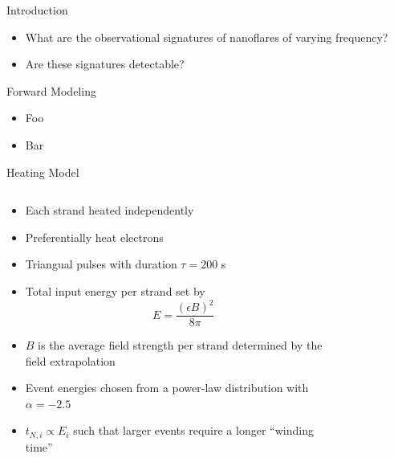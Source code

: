 \documentclass[final]{beamer}
\begin{document}
\begin{frame}
\begin{columns}[T]
\begin{column}{0.49\linewidth}
\begin{block}{Introduction}
\begin{itemize}
      \begin{itemize}
        \item What are the observational signatures of nanoflares of varying frequency?
        \item Are these signatures detectable?
      \end{itemize}
    \end{itemize}
    \end{block}
    \begin{block}{Forward Modeling}
      \vspace{-1ex}
      \begin{itemize}
      \item Foo
      \item Bar
      \end{itemize}
    \end{block}
    \begin{block}{Heating Model}
      \begin{columns}[T]
      \begin{column}{0.49\columnwidth}
        \begin{itemize}
        \item Each strand heated independently
        \item Preferentially heat electrons
        \item Triangual pulses with duration $\tau=200$ s
        \item Total input energy per strand set by 
              \begin{equation*}
                E = \frac{(\epsilon B)^2}{8\pi}
              \end{equation*}
        \item $B$ is the average field strength per strand determined by the field extrapolation
        \item Event energies chosen from a power-law distribution with $\alpha=-2.5$
        \item $t_{N,i}\propto E_i$ such that larger events require a longer ``winding time''
        \end{itemize}
      \end{column}
      \begin{column}{0.49\columnwidth}
        \begin{figure}

\end{figure}
\end{column}
\end{columns}
\end{block}
\end{column}
\end{columns}
\end{frame}
\end{document}
